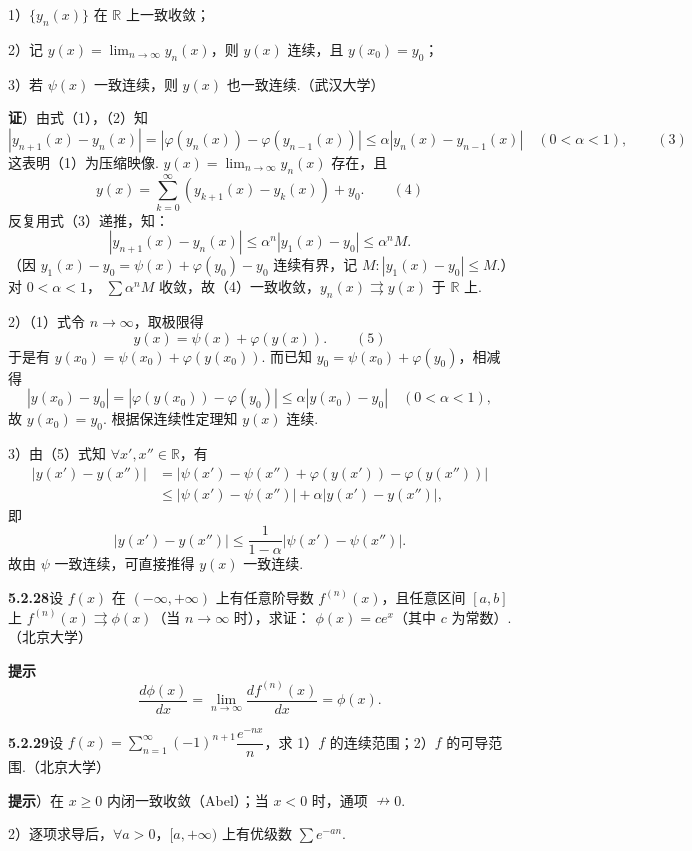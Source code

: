 \documentclass[UTF8,12pt,a4paper,fontset=fandol]{ctexart}
\begin{document}
1）$\{y_n(x)\}$ 在 $\mathbb R$ 上一致收敛；

2）记 $y(x)=\displaystyle\lim_{n\to\infty}y_n(x)$，则 $y(x)$ 连续，且 $y(x_0)=y_0$；

3）若 $\psi(x)$ 一致连续，则 $y(x)$ 也一致连续.（武汉大学）

\noindent\textbf{证}）由式（1），（2）知
\[
  |y_{n+1}(x)-y_n(x)|
  =|\varphi(y_n(x))-\varphi(y_{n-1}(x))|
  \le\alpha|y_n(x)-y_{n-1}(x)|\quad(0<\alpha<1),
\qquad(3)
\]
这表明（1）为压缩映像. $y(x)=\displaystyle\lim_{n\to\infty}y_n(x)$ 存在，且
\[
  y(x)=\sum_{k=0}^{\infty}(y_{k+1}(x)-y_k(x))+y_0.
\qquad(4)
\]
反复用式（3）递推，知：
\[
  |y_{n+1}(x)-y_n(x)|\le\alpha^n|y_1(x)-y_0|\le\alpha^n M.
\]
（因 $y_1(x)-y_0=\psi(x)+\varphi(y_0)-y_0$ 连续有界，记
$M:|y_1(x)-y_0|\le M$.）对 $0<\alpha<1$，
$\displaystyle\sum\alpha^nM$ 收敛，故（4）一致收敛，$y_n(x)\rightrightarrows y(x)$ 于
$\mathbb R$ 上.

2）（1）式令 $n\to\infty$，取极限得
\[
  y(x)=\psi(x)+\varphi(y(x)).
\qquad(5)
\]
于是有 $y(x_0)=\psi(x_0)+\varphi(y(x_0))$. 而已知
$y_0=\psi(x_0)+\varphi(y_0)$，相减得
\[
  |y(x_0)-y_0|=|\varphi(y(x_0))-\varphi(y_0)|
  \le\alpha|y(x_0)-y_0|\quad(0<\alpha<1),
\]
故 $y(x_0)=y_0$. 根据保连续性定理知 $y(x)$ 连续.

3）由（5）式知 $\forall x',x''\in\mathbb R$，有
\[
\begin{aligned}
|y(x')-y(x'')|
&=|\psi(x')-\psi(x'')+\varphi(y(x'))-\varphi(y(x''))|\\
&\le|\psi(x')-\psi(x'')|+\alpha|y(x')-y(x'')|,
\end{aligned}
\]
即
\[
  |y(x')-y(x'')|\le\frac1{1-\alpha}|\psi(x')-\psi(x'')|.
\]
故由 $\psi$ 一致连续，可直接推得 $y(x)$ 一致连续.

\noindent\textbf{5.2.28}\quad 设 $f(x)$ 在 $(-\infty,+\infty)$ 上有任意阶导数 $f^{(n)}(x)$，且任意区间 $[a,b]$ 上
$f^{(n)}(x)\rightrightarrows\phi(x)$（当 $n\to\infty$ 时），求证：
$\phi(x)=ce^x$（其中 $c$ 为常数）.（北京大学）

\noindent\textbf{提示}\quad
\[
  \frac{d\phi(x)}{dx}
  =\lim_{n\to\infty}\frac{df^{(n)}(x)}{dx}
  =\phi(x).
\]

\noindent\textbf{5.2.29}\quad 设
$f(x)=\displaystyle\sum_{n=1}^{\infty}(-1)^{n+1}\dfrac{e^{-nx}}n$，求 1）$f$ 的连续范围；2）$f$ 的可导范围.（北京大学）

\noindent\textbf{提示}）在 $x\ge0$ 内闭一致收敛（Abel）；当 $x<0$ 时，通项 $\nrightarrow0$.

2）逐项求导后，$\forall a>0$，$[a,+\infty)$ 上有优级数 $\displaystyle\sum e^{-an}$.
\end{document}
